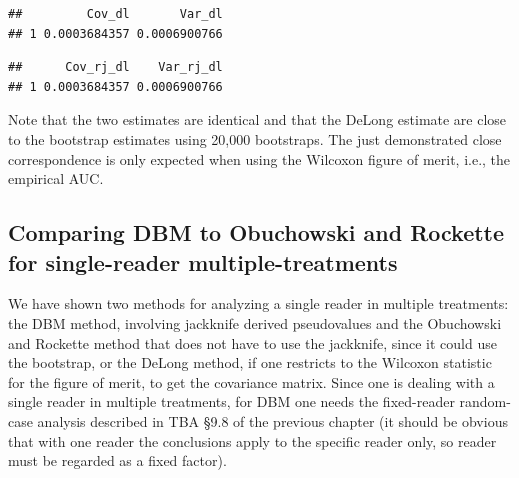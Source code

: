 \documentclass[
]{book}
\newenvironment{Shaded}{\begin{snugshade}}{\end{snugshade}}
\newcommand{\DataTypeTok}[1]{\textcolor[rgb]{0.13,0.29,0.53}{#1}}
\newcommand{\KeywordTok}[1]{\textcolor[rgb]{0.13,0.29,0.53}{\textbf{#1}}}
\newcommand{\NormalTok}[1]{#1}
\newcommand{\OperatorTok}[1]{\textcolor[rgb]{0.81,0.36,0.00}{\textbf{#1}}}
\newcommand{\StringTok}[1]{\textcolor[rgb]{0.31,0.60,0.02}{#1}}
\begin{document}
\begin{verbatim}
##         Cov_dl       Var_dl
## 1 0.0003684357 0.0006900766
\end{verbatim}

\begin{Shaded}
\end{Shaded}

\begin{verbatim}
##      Cov_rj_dl    Var_rj_dl
## 1 0.0003684357 0.0006900766
\end{verbatim}

Note that the two estimates are identical and that the DeLong estimate are close to the bootstrap estimates using 20,000 bootstraps. The just demonstrated close correspondence is only expected when using the Wilcoxon figure of merit, i.e., the empirical AUC.

\hypertarget{or-method-intro-compare-dbm-or}{%
\subsection{Comparing DBM to Obuchowski and Rockette for single-reader multiple-treatments}\label{or-method-intro-compare-dbm-or}}

We have shown two methods for analyzing a single reader in multiple treatments: the DBM method, involving jackknife derived pseudovalues and the Obuchowski and Rockette method that does not have to use the jackknife, since it could use the bootstrap, or the DeLong method, if one restricts to the Wilcoxon statistic for the figure of merit, to get the covariance matrix. Since one is dealing with a single reader in multiple treatments, for DBM one needs the fixed-reader random-case analysis described in TBA §9.8 of the previous chapter (it should be obvious that with one reader the conclusions apply to the specific reader only, so reader must be regarded as a fixed factor).
\end{document}
